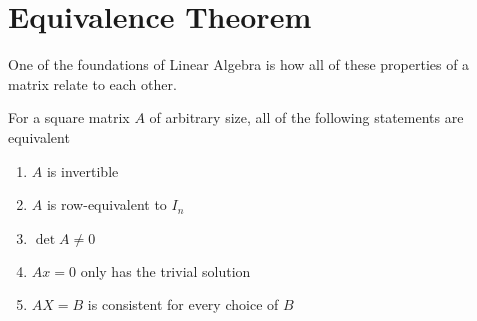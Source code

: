 \section{Equivalence Theorem} \label{equivalencetheorem}
One of the foundations of Linear Algebra is how all of these properties of a
matrix relate to each other.

\begin{theorem}
For a square matrix $A$ of arbitrary size, all of the following statements are
equivalent
\begin{enumerate}
    \item $A$ is invertible
    \item $A$ is row-equivalent to  $I_n$ 
    \item $\det{A} \neq 0$
    \item $Ax = 0$ only has the trivial solution
    \item $AX=B$ is consistent for every choice of $B$ 
\end{enumerate}
\end{theorem} 
